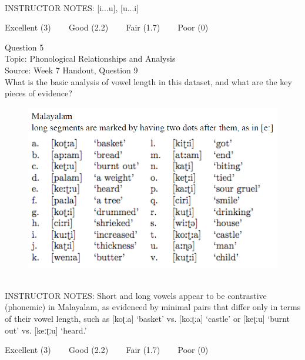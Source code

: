 \documentclass[12pt]{article}
\begin{document}
~\\
INSTRUCTOR NOTES: [i...u], [u...i]


\vfill
Excellent (3) ~~~ Good (2.2) ~~~ Fair (1.7) ~~~ Poor (0)
\newpage

{\large Question 5}\\

Topic: Phonological Relationships and Analysis\\
Source: Week 7 Handout, Question 9\\

What is the basic analysis of vowel length in this dataset, and what are the key pieces of evidence?\\

\begin{figure}[H]
\includegraphics{../images/malayalam.png}
\end{figure}

~\\
INSTRUCTOR NOTES: Short and long vowels appear to be contrastive (phonemic) in Malayalam, as evidenced by minimal pairs that differ only in terms of their vowel length, such as [koʈːa] ‘basket’ vs. [koːʈːa] ‘castle’ or [keʈːu] ‘burnt out’ vs. [keːʈːu] ‘heard.’


\vfill
Excellent (3) ~~~ Good (2.2) ~~~ Fair (1.7) ~~~ Poor (0)
\newpage

\begin{center}
\textbf{{\color{red}{\HUGE END OF EXAM}}}\\

\end{center}
\newpage

\begin{center}
\textbf{{\color{blue}{\HUGE START OF EXAM\\}}}

\textbf{{\color{blue}{\HUGE Student ID: 36273\\}}}

\textbf{{\color{blue}{\HUGE \\}}}

\end{center}
\newpage
\end{document}
